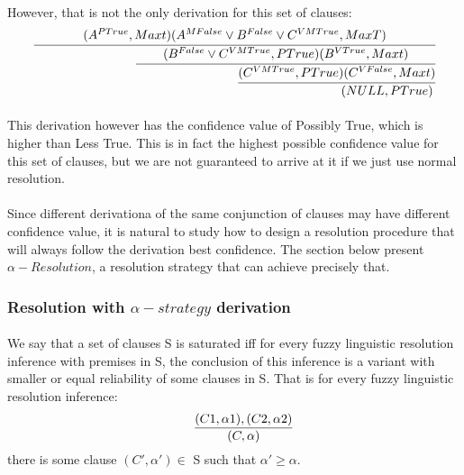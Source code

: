 \documentclass[part1.tex]{subfiles}
\begin{document}
\paragraph{} However, that is not the only derivation for this
set of clauses:
\[
  \cfrac{ (A^{PTrue},Maxt) (A^{MFalse} \vee B^{False} \vee
  C^{VMTrue}, MaxT)}
  {\qquad\qquad\qquad\qquad\cfrac{ (B^{False} \vee C^{VMTrue}, PTrue) (B^{VTrue}, Maxt)}
    {\qquad\qquad\qquad\qquad\cfrac {(C^{VMTrue}, PTrue) (C^{VFalse}, Maxt)}
      {\qquad\qquad\qquad\qquad(NULL, PTrue)
        }
     }
    }
\]
\paragraph{} This derivation however has the confidence value of
Possibly True, which is higher than Less True. This is in fact
the highest possible confidence value for this set of clauses,
but we are not guaranteed to arrive at it if we just use normal
resolution.
\paragraph{} Since different derivationa of the same conjunction of clauses may have different
confidence value, it is natural to study how to design a resolution 
procedure that will always follow the derivation best confidence. The section below present
$\alpha-Resolution$, a resolution strategy that can achieve
precisely that.
\subsubsection{Resolution with $\alpha-strategy$ derivation}
\paragraph{} 
We say that a set of clauses S is saturated iff for every fuzzy
linguistic resolution inference with premises in S, the
conclusion of this inference is a variant with smaller or equal
reliability of some clauses in S. That is for every fuzzy
linguistic resolution inference:\\
\[\indent \frac{(C1, \alpha1), (C2, \alpha2)}{(C,\alpha)}
\]
\indent there is some clause \((C',\alpha') \in \) S such that \(\alpha' \ge \alpha\).
\end{document}
